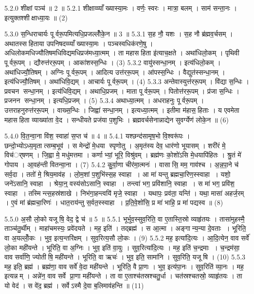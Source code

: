 5.2.0
शीक्षां पञ्च॑ ॥ 2 ॥
5.2.1
शीक्षाव्व्याँख्यास्या॒मः । वर्णः॒ स्वरः । मात्रा॒ बलम् । साम॑ सन्ता॒नः । इत्युक्तश्शीक्षाध्या॒यः ॥ (2)
\anuvakamend

5.3.0
स॒न्धिराचार्यः पूर्वरू॒पमित्यधि॒प्रजल्लोँ॑के॒न ॥ 3 ॥
5.3.1
स॒ह नौ॒ यशः । स॒ह नौ ब्र॑ह्मव॒र्चसम् । अथातस्सहिताया उपनिषदव्व्याँख्यास्या॒मः । पञ्चस्वधिक॑रणे॒षु । अधिलोकमधिज्यौतिषमधिविद्यमधिप्रज॑मध्या॒त्मम् । ता महासहिता इ॑त्याच॒क्षते । अथा॑धिलो॒कम् । पृथिवी पूर्वरू॒पम् । द्यौरुत्त॑ररू॒पम् । आका॑शस्स॒न्धिः । (3)
5.3.2
वायु॑स्सन्धा॒नम् । इत्य॑धिलो॒कम् । अथा॑धिज्यौ॒तिषम् । अग्निः पूर्वरू॒पम् । आदित्य उत्त॑ररू॒पम् । आ॑पस्स॒न्धिः । वैद्युत॑स्सन्धा॒नम् । इत्य॑धिज्यौ॒तिषम् । अथा॑धिवि॒द्यम् । आचार्यः पूर्वरू॒पम् । (4)
5.3.3
अन्तेवास्युत्त॑ररू॒पम् । वि॑द्या स॒न्धिः । प्रवचन सन्धा॒नम् । इत्य॑धिवि॒द्यम् । अथाधि॒प्रजम् । माता पूर्वरू॒पम् । पितोत्त॑ररू॒पम् । प्र॑जा स॒न्धिः । प्रजनन सन्धा॒नम् । इत्यधि॒प्रजम् । (5)
5.3.4
अथाध्या॒त्मम् । अधराहनुः पूर्वरू॒पम् । उत्तराहनुरुत्त॑ररू॒पम् । वाख्स॒न्धिः । जिह्वा॑ सन्धा॒नम् । इत्यध्या॒त्मम् । इतीमा म॑हास॒हिताः । य एवमेता महासहिता व्याख्या॑ता वे॒द । सन्धीयते प्रज॑या प॒शुभिः । ब्रह्मवर्चसेनान्नाद्येन सुवर्ग्येण॑ लोके॒न ॥ (6)
\anuvakamend

5.4.0
वि॒त॒न्वा॒ना वि॑श॒ स्वाहा॑ स॒प्त च॑ ॥ 4 ॥
5.4.1
यश्छन्द॑सामृष॒भो वि॒श्वरू॑पः । छन्दो॒भ्योऽध्य॒मृतात्सम्ब॒भूव॑ । स मेन्द्रो॑ मे॒धया स्पृणोतु । अ॒मृत॑स्य देव॒ धार॑णो भूयासम् । शरी॑रं मे॒ विच॑र््षणम् । जि॒ह्वा मे॒ मधु॑मत्तमा । कर्णाभ्यां॒ भूरि॒ विश्रु॑वम् । ब्रह्म॑णः को॒शो॑ऽसि मे॒धयापि॑हितः । श्रु॒तं मे॑ गोपाय । आ॒वह॑न्ती वितन्वा॒ना । (7)
5.4.2
कु॒र्वा॒णा चीर॑मा॒त्मनः॑ । वासासि॒ मम॒ गाव॑श्च । अ॒न्न॒पा॒ने च॑ सर्व॒दा । ततो॑ मे॒ श्रिय॒माव॑ह । लो॒म॒शां प॒शुभि॑स्स॒ह स्वाहा । आ मा॑ यन्तु ब्रह्मचा॒रिण॒स्स्वाहा । यशो॒ जने॑ऽसानि॒ स्वाहा । श्रेया॒न्॒ वस्य॑सोऽसानि॒ स्वाहा । तन्त्वा॑ भग॒ प्रवि॑शानि॒ स्वाहा । स मा॑ भग॒ प्रवि॑श॒ स्वाहा । तस्मिन्त्स॒हस्र॑शाखे । निभ॑गा॒हन्त्वयि॑ मृजे॒ स्वाहा । यथापः॒ प्रव॑ता॒ यन्ति॑ । यथा॒ मासा॑ अहर्ज॒रम् । ए॒वं मां ब्र॑ह्मचा॒रिणः॑ । धात॒राय॑न्तु स॒र्वत॒स्स्वाहा । प्र॒ति॒वे॒शो॑सि॒ प्र मा॑ भाहि॒ प्र मा॑ पद्यस्व ॥ (8)
\anuvakamend

5.5.0
अ॒सौ लो॒को यजूषि॒ वेद॒ द्वे च॑ ॥ 5 ॥
5.5.1
भूर्भुव॒स्सुव॒रिति॒ वा ए॒तास्ति॒स्रो व्याहृ॑तयः । तासा॑मुहस्मै॒ ताञ्च॑तु॒र्थीम् । माहा॑चमस्यः॒ प्रवे॑दयते । मह॒ इति॑ । तद्ब्रह्म॑ । स आ॒त्मा । अङ्गान्य॒न्या दे॒वताः । भूरिति॒ वा अ॒यल्लोँ॒कः । भुव॒ इत्य॒न्तरि॑क्षम् । सुव॒रित्य॒सौ लो॒कः । (9)
5.5.2
मह॒ इत्या॑दि॒त्यः । आ॒दि॒त्येन॒ वाव सर्वे॑ लो॒का मही॑यन्ते । भूरिति॒ वा अ॒ग्निः । भुव॒ इति॑ वा॒युः । सुव॒रित्या॑दि॒त्यः । मह॒ इति॑ च॒न्द्रमाः । च॒न्द्रम॑सा॒ वाव सर्वा॑णि॒ ज्योतीषि॒ मही॑यन्ते । भूरिति॒ वा ऋचः॑ । भुव॒ इति॒ सामा॑नि । सुव॒रिति॒ यजूषि । (10)
5.5.3
मह॒ इति॒ ब्रह्म॑ । ब्रह्म॑णा॒ वाव सर्वे॑ वे॒दा मही॑यन्ते । भूरिति॒ वै प्रा॒णः । भुव॒ इत्य॑पा॒नः । सुव॒रिति॑ व्या॒नः । मह॒ इत्यन्नम् । अन्ने॑न॒ वाव सर्वे प्रा॒णा मही॑यन्ते । ता वा ए॒ताश्च॑तस्रश्चतु॒र्धा । चत॑स्रश्चतस्रो॒ व्याहृ॑तयः । ता यो वेद॑ । स वे॑द॒ ब्रह्म॑ । सर्वेऽस्मै दे॒वा ब॒लिमाव॑हन्ति ॥ (11)
\anuvakamend

